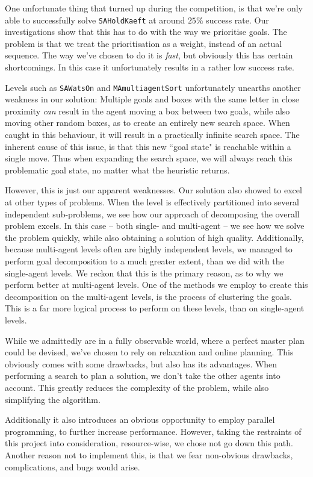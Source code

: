 \documentclass[letterpaper]{article}
\begin{document}
	One unfortunate thing that turned up during the competition, is that we're only able to successfully solve \verb=SAHoldKaeft= at around $25\%$ success rate. Our investigations show that this has to do with the way we prioritise goals. The problem is that we treat the prioritisation as a weight, instead of an actual sequence. The way we've chosen to do it is \emph{fast}, but obviously this has certain shortcomings. In this case it unfortunately results in a rather low success rate. 

	Levels such as \verb=SAWatsOn= and \verb=MAmultiagentSort= unfortunately unearths another weakness in our solution: Multiple goals and boxes with the same letter in close proximity \emph{can} result in the agent moving a box between two goals, while also moving other random boxes, as to create an entirely new search space. When caught in this behaviour, it will result in a practically infinite search space. The inherent cause of this issue, is that this new ``goal state" is reachable within a single move. Thus when expanding the search space, we will always reach this problematic goal state, no matter what the heuristic returns.

	However, this is just our apparent weaknesses. Our solution also showed to excel at other types of problems. When the level is effectively partitioned into several independent sub-problems, we see how our approach of decomposing the overall problem excels. In this case -- both single- and multi-agent -- we see how we solve the problem quickly, while also obtaining a solution of high quality. Additionally, because multi-agent levels often are highly independent levels, we managed to perform goal decomposition to a much greater extent, than we did with the single-agent levels. We reckon that this is the primary reason, as to why we perform better at multi-agent levels. One of the methods we employ to create this decomposition on the multi-agent levels, is the process of clustering the goals. This is a far more logical process to perform on these levels, than on single-agent levels.

	While we admittedly are in a fully observable world, where a perfect master plan could be devised, we've chosen to rely on relaxation and online planning. This obviously comes with some drawbacks, but also has its advantages. When performing a search to plan a solution, we don't take the other agents into account. This greatly reduces the complexity of the problem, while also simplifying the algorithm. 

	Additionally it also introduces an obvious opportunity to employ parallel programming, to further increase performance. However, taking the restraints of this project into consideration, resource-wise, we chose not go down this path. Another reason not to implement this, is that we fear non-obvious drawbacks, complications, and bugs would arise.
	
\end{document}
